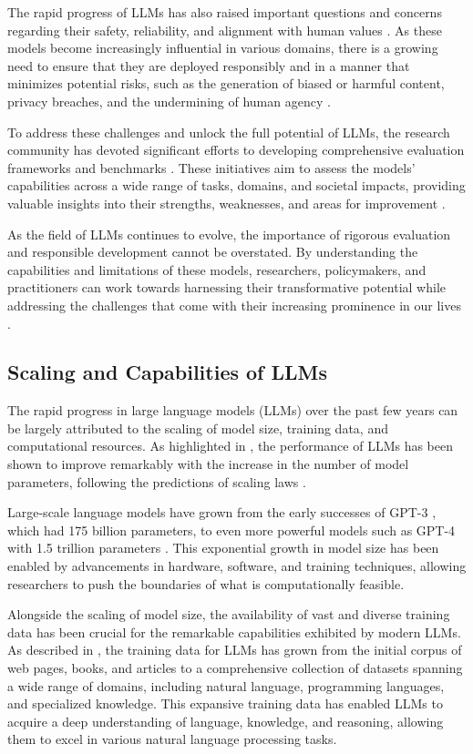 \documentclass[11pt]{article}
\begin{document}
The rapid progress of LLMs has also raised important questions and concerns regarding their safety, reliability, and alignment with human values \cite{ref10,ref11}. As these models become increasingly influential in various domains, there is a growing need to ensure that they are deployed responsibly and in a manner that minimizes potential risks, such as the generation of biased or harmful content, privacy breaches, and the undermining of human agency \cite{ref7,ref12}.

To address these challenges and unlock the full potential of LLMs, the research community has devoted significant efforts to developing comprehensive evaluation frameworks and benchmarks \cite{ref11,ref13}. These initiatives aim to assess the models' capabilities across a wide range of tasks, domains, and societal impacts, providing valuable insights into their strengths, weaknesses, and areas for improvement \cite{ref14,ref15}.

As the field of LLMs continues to evolve, the importance of rigorous evaluation and responsible development cannot be overstated. By understanding the capabilities and limitations of these models, researchers, policymakers, and practitioners can work towards harnessing their transformative potential while addressing the challenges that come with their increasing prominence in our lives \cite{ref16,ref17}.

\subsection{Scaling and Capabilities of LLMs}

The rapid progress in large language models (LLMs) over the past few years can be largely attributed to the scaling of model size, training data, and computational resources. As highlighted in \cite{ref18}, the performance of LLMs has been shown to improve remarkably with the increase in the number of model parameters, following the predictions of scaling laws \cite{ref19,ref20}.

Large-scale language models have grown from the early successes of GPT-3 \cite{ref21}, which had 175 billion parameters, to even more powerful models such as GPT-4 with 1.5 trillion parameters \cite{ref22}. This exponential growth in model size has been enabled by advancements in hardware, software, and training techniques, allowing researchers to push the boundaries of what is computationally feasible.

Alongside the scaling of model size, the availability of vast and diverse training data has been crucial for the remarkable capabilities exhibited by modern LLMs. As described in \cite{ref23}, the training data for LLMs has grown from the initial corpus of web pages, books, and articles to a comprehensive collection of datasets spanning a wide range of domains, including natural language, programming languages, and specialized knowledge. This expansive training data has enabled LLMs to acquire a deep understanding of language, knowledge, and reasoning, allowing them to excel in various natural language processing tasks.
\end{document}
